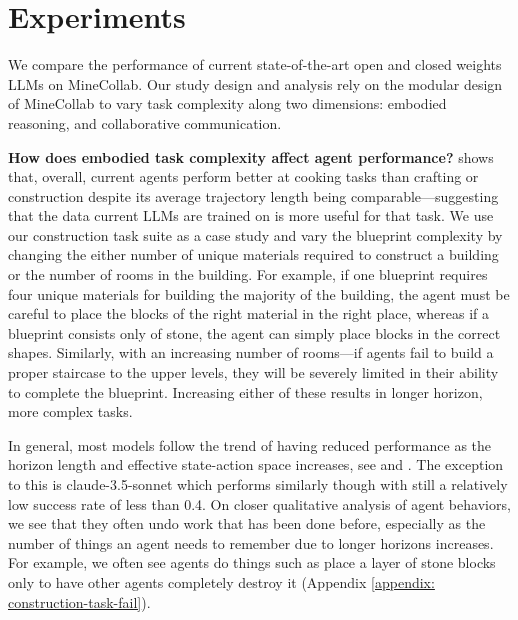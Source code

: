 \documentclass{article}
\begin{document}
\section{Experiments} \label{sec: experiments}

We compare the performance of current state-of-the-art open and closed weights LLMs on MineCollab.
Our study design and analysis rely on the modular design of MineCollab to vary task complexity along two dimensions: embodied reasoning, and collaborative communication.

\textbf{How does embodied task complexity affect agent performance?}
 shows that, overall, current agents perform better at cooking tasks than crafting or construction despite its average trajectory length being comparable---suggesting that the data current LLMs are trained on is more useful for that task.
We use our construction task suite as a case study and vary the blueprint complexity by changing the either number of unique materials required to construct a building or the number of rooms in the building.
For example, if one blueprint requires four unique materials for building the majority of the building, the agent must be careful to place the blocks of the right material in the right place, whereas if a blueprint consists only of stone, the agent can simply place blocks in the correct shapes.
Similarly, with an increasing number of rooms---if agents fail to build a proper staircase to the upper levels, they will be severely limited in their ability to complete the blueprint.
Increasing either of these results in longer horizon, more complex tasks.

In general, most models follow the trend of having reduced performance as the horizon length and effective state-action space increases, see  and . 
The exception to this is claude-3.5-sonnet which performs similarly though with still a relatively low success rate of less than 0.4.
On closer qualitative analysis of agent behaviors, we see that they often undo work that has been done before, especially as the number of things an agent needs to remember due to longer horizons increases. 
For example, we often see agents do things such as place a layer of stone blocks only to have other agents completely destroy it (Appendix \ref{appendix: construction-task-fail}). 
\end{document}
